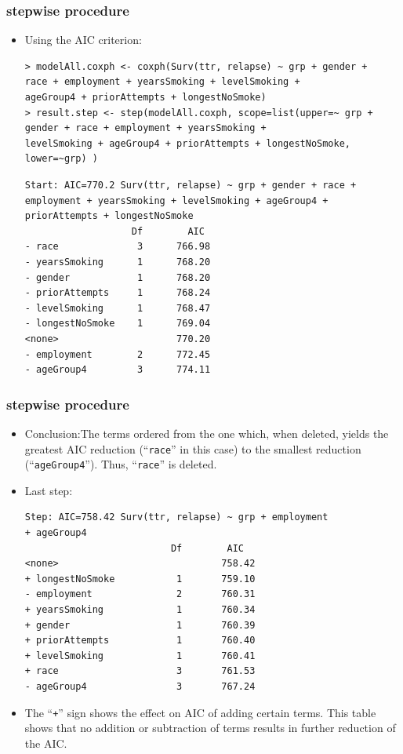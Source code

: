 \documentclass{beamer}
\begin{document}
\pagebreak
\begin{frame}[fragile]
\frametitle{stepwise procedure}	
\begin{itemize}
\item Using the AIC criterion:
\begin{Verbatim}
> modelAll.coxph <- coxph(Surv(ttr, relapse) ~ grp + gender + 
race + employment + yearsSmoking + levelSmoking +
ageGroup4 + priorAttempts + longestNoSmoke)
> result.step <- step(modelAll.coxph, scope=list(upper=~ grp + 
gender + race + employment + yearsSmoking +
levelSmoking + ageGroup4 + priorAttempts + longestNoSmoke, 
lower=~grp) )
\end{Verbatim}
\begin{Verbatim}
Start: AIC=770.2 Surv(ttr, relapse) ~ grp + gender + race + 
employment + yearsSmoking + levelSmoking + ageGroup4 + 
priorAttempts + longestNoSmoke
                   Df        AIC
- race              3      766.98
- yearsSmoking      1      768.20
- gender            1      768.20
- priorAttempts     1      768.24
- levelSmoking      1      768.47
- longestNoSmoke    1      769.04
<none>                     770.20
- employment        2      772.45
- ageGroup4         3      774.11
\end{Verbatim}
\end{itemize}
\end{frame}

\pagebreak
\begin{frame}[fragile]
\frametitle{stepwise procedure}	
\begin{itemize}
\item Conclusion:The terms ordered from the one which, when deleted, yields the greatest AIC reduction (``\texttt{race}'' in this case) to the smallest reduction (``\texttt{ageGroup4}''). Thus, ``\texttt{race}'' is deleted.
\item Last step:
\begin{Verbatim}
Step: AIC=758.42 Surv(ttr, relapse) ~ grp + employment 
+ ageGroup4
                          Df        AIC
<none>                             758.42
+ longestNoSmoke           1       759.10
- employment               2       760.31
+ yearsSmoking             1       760.34
+ gender                   1       760.39
+ priorAttempts            1       760.40
+ levelSmoking             1       760.41
+ race                     3       761.53
- ageGroup4                3       767.24
\end{Verbatim}
\item The ``\texttt{+}'' sign shows the effect on AIC of adding certain terms. This table shows that no addition or subtraction of terms results in further reduction of the AIC.
\end{itemize}
\end{frame}
\end{document}

